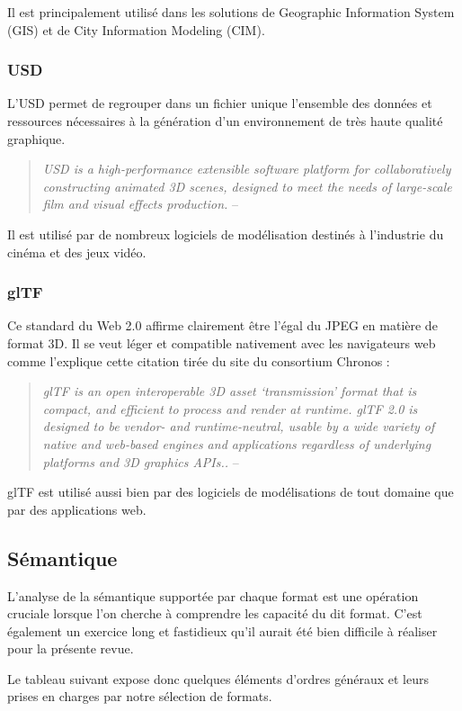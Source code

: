 \documentclass[a4paper,12pt]{article}
\begin{document}
Il est principalement utilisé dans les solutions de Geographic Information System (GIS) et de City Information Modeling (CIM).
\subsubsection*{USD}
\label{sec:org56b7350}
L'USD permet de regrouper dans un fichier unique l'ensemble des données et ressources nécessaires à la génération d'un environnement de très haute qualité graphique. 
\begin{quote}
\emph{USD is a high-performance extensible software platform for collaboratively constructing animated 3D scenes, designed to meet the needs of large-scale film and visual effects production.} -- \cite{noauthor_usd_nodate}
\end{quote}

Il est utilisé par de nombreux logiciels de modélisation destinés à l'industrie du cinéma et des jeux vidéo.
\subsubsection*{glTF}
\label{sec:orgca5abea}
Ce standard du Web 2.0 affirme clairement être l'égal du JPEG en matière de format 3D. Il se veut léger et compatible nativement avec les navigateurs web comme l'explique cette citation tirée du site du consortium Chronos : \autocite{khronosGlTFRuntime}
\begin{quote}
\emph{glTF is an open interoperable 3D asset ‘transmission’ format that is compact, and efficient to process and render at runtime. glTF 2.0 is designed to be vendor- and runtime-neutral, usable by a wide variety of native and web-based engines and applications regardless of underlying platforms and 3D graphics APIs..} -- \cite{GlTFSpecification2021}
\end{quote}

glTF est utilisé aussi bien par des logiciels de modélisations de tout domaine que par des applications web.
\subsection*{Sémantique}
\label{sec:org9773990}
L'analyse de la sémantique supportée par chaque format est une opération cruciale lorsque l'on cherche à comprendre les capacité du dit format. C'est également un exercice long et fastidieux qu'il aurait été bien difficile à réaliser pour la présente revue. 

Le tableau suivant expose donc quelques éléments d'ordres généraux et leurs prises en charges par notre sélection de formats.
\end{document}
